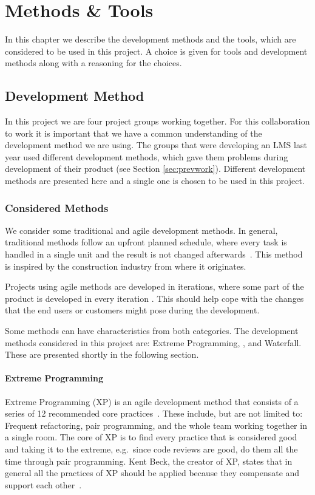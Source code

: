 \chapter{Methods \& Tools}%
In this chapter we describe the development methods and the tools, which are considered to be used in this project.
A choice is given for tools and development methods along with a reasoning for the choices.

\section{Development Method}
\label{sec:devMethod}
In this project we are four project groups working together.
For this collaboration to work it is important that we have a common understanding of the development method we are using.
The groups that were developing an LMS last year used different development methods, which gave them problems during development of their product (see Section \ref{sec:prevwork}).
Different development methods are presented here and a single one is chosen to be used in this project.

\subsection{Considered Methods}
We consider some traditional and agile development methods. 
In general, traditional methods follow an upfront planned schedule, where every task is handled in a single unit and the result is not changed afterwards~\cite[sec.~2.7]{Poppendieck00}.
This method is inspired by the construction industry from where it originates.

Projects using agile methods are developed in iterations, where some part of the product is developed in every iteration \cite[p.~25]{Larman04}.
This should help cope with the changes that the end users or customers might pose during the development.

Some methods can have characteristics from both categories.
The development methods considered in this project are: Extreme Programming, \scrum{}, and Waterfall.
These are presented shortly in the following section.

\subsubsection{Extreme Programming}
Extreme Programming (XP) is an agile development method that consists of a series of 12 recommended core practices~\cite[p.~137]{Larman04}.
These include, but are not limited to: Frequent refactoring, pair programming, and the whole team working together in a single room.
The core of XP is to find every practice that is considered good and taking it to the extreme, e.g.\ since code reviews are good, do them all the time through pair programming.
Kent Beck, the creator of XP, states that in general all the practices of XP should be applied because they compensate and support each other~\cite[p.~156-157]{Larman04}.

